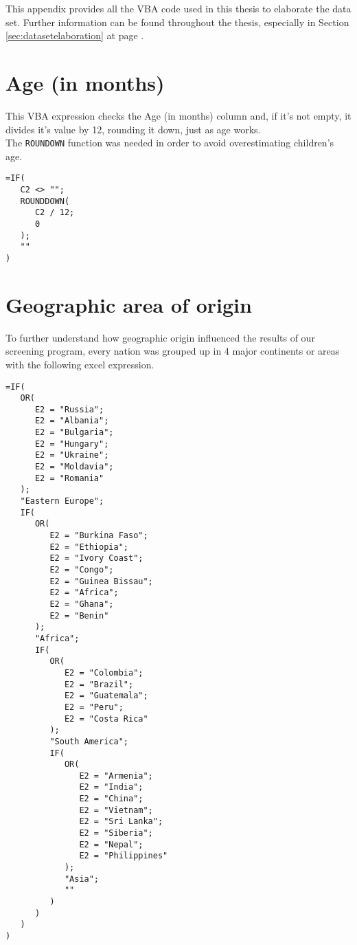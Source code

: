 \label{chap:appendixvbaexpressions}
This appendix provides all the VBA code used in this thesis to elaborate the data set. Further information can be found throughout the thesis, especially in Section \ref{sec:datasetelaboration} at page \pageref{sec:datasetelaboration}.

\section{Age (in months)}\label{sec:ageinmonths}
This VBA expression checks the Age (in months) column and, if it's not empty, it divides it's value by 12, rounding it down, just as age works.\\
The \texttt{ROUNDOWN} function was needed in order to avoid overestimating children's age.

\begin{minipage}{\linewidth}
\begin{lstlisting}
=IF(
   C2 <> "";
   ROUNDDOWN(
      C2 / 12;
      0
   );
   ""
)
\end{lstlisting}
\end{minipage}

\section{Geographic area of origin}\label{sec:geographicarea}
To further understand how geographic origin influenced the results of our screening program, every nation was grouped up in 4 major continents or areas with the following excel expression.

\begin{lstlisting}
=IF(
   OR(
      E2 = "Russia";
      E2 = "Albania";
      E2 = "Bulgaria";
      E2 = "Hungary";
      E2 = "Ukraine";
      E2 = "Moldavia";
      E2 = "Romania"
   );
   "Eastern Europe";
   IF(
      OR(
         E2 = "Burkina Faso";
         E2 = "Ethiopia";
         E2 = "Ivory Coast";
         E2 = "Congo";
         E2 = "Guinea Bissau";
         E2 = "Africa";
         E2 = "Ghana";
         E2 = "Benin"
      );
      "Africa";
      IF(
         OR(
            E2 = "Colombia";
            E2 = "Brazil";
            E2 = "Guatemala";
            E2 = "Peru";
            E2 = "Costa Rica"
         );
         "South America";
         IF(
            OR(
               E2 = "Armenia";
               E2 = "India";
               E2 = "China";
               E2 = "Vietnam";
               E2 = "Sri Lanka";
               E2 = "Siberia";
               E2 = "Nepal";
               E2 = "Philippines"
            );
            "Asia";
            ""
         )
      )
   )
)
\end{lstlisting}

